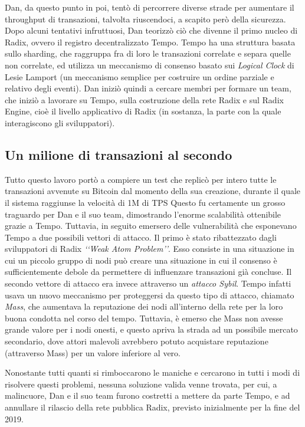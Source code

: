 Dan, da questo punto in poi, tentò di percorrere diverse strade per aumentare il throughput di transazioni, talvolta riuscendoci, a scapito però della sicurezza. Dopo alcuni tentativi infruttuosi, Dan teorizzò ciò che divenne il primo nucleo di Radix, ovvero il registro decentralizzato Tempo. Tempo ha una struttura basata sullo sharding, che raggruppa fra di loro le transazioni correlate e separa quelle non correlate, ed utilizza un meccanismo di consenso basato sui \textit{Logical Clock} di Lesie Lamport (un meccanismo semplice per costruire un ordine parziale e relativo degli eventi). Dan iniziò quindi a cercare membri per formare un team, che iniziò a lavorare su Tempo, sulla costruzione della rete Radix e sul Radix Engine, cioè il livello applicativo di Radix (in sostanza, la parte con la quale interagiscono gli sviluppatori). 

\subsection{Un milione di transazioni al secondo}

Tutto questo lavoro portò a compiere un test che replicò per intero tutte le transazioni avvenute su Bitcoin dal momento della sua creazione, durante il quale il sistema raggiunse la velocità di 1M di TPS Questo fu certamente un grosso traguardo per Dan e il suo team, dimostrando l'enorme scalabilità ottenibile grazie a Tempo. Tuttavia, in seguito emersero delle vulnerabilità che esponevano Tempo a due possibili vettori di attacco. Il primo è stato ribattezzato dagli sviluppatori di Radix \textit{‘‘Weak Atom Problem’’}. Esso consiste in una situazione in cui un piccolo gruppo di nodi può creare una situazione in cui il consenso è sufficientemente debole da permettere di influenzare transazioni già concluse. Il secondo vettore di attacco era invece attraverso un \textit{attacco Sybil}. Tempo infatti usava un nuovo meccanismo per proteggersi da questo tipo di attacco, chiamato \textit{Mass}, che aumentava la reputazione dei nodi all'interno della rete per la loro buona condotta nel corso del tempo. Tuttavia, è emerso che Mass non avesse grande valore per i nodi onesti, e questo apriva la strada ad un possibile mercato secondario, dove attori malevoli avrebbero potuto acquistare reputazione  (attraverso Mass) per un valore inferiore al vero.

Nonostante tutti quanti si rimboccarono le maniche e cercarono in tutti i modi di risolvere questi problemi, nessuna soluzione valida venne trovata, per cui, a malincuore, Dan e il suo team furono costretti a mettere da parte Tempo, e ad annullare il rilascio della rete pubblica Radix, previsto inizialmente per la fine del 2019.


